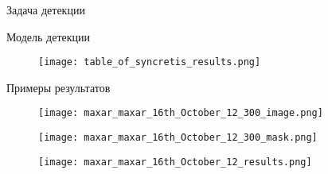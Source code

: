 \documentclass{beamer}
\begin{document}
\begin{section}{Задача детекции}
\begin{frame}{Модель детекции}
\begin{figure}[H]
	\centering
	\texttt{[image: table\_of\_syncretis\_results.png]}
\end{figure}

\end{frame}

\begin{frame}{Примеры результатов}
\begin{figure}[H]
	\centering
	\texttt{[image: maxar\_maxar\_16th\_October\_12\_300\_image.png]}
\end{figure}

\begin{figure}
	\centering
	\begin{minipage}{0.5\textwidth}
		\texttt{[image: maxar\_maxar\_16th\_October\_12\_300\_mask.png]}
	\end{minipage}%
	\begin{minipage}{0.5\textwidth}
		\texttt{[image: maxar\_maxar\_16th\_October\_12\_results.png]}
	\end{minipage}
\end{figure}

\end{frame}

\end{section}
\end{document}
